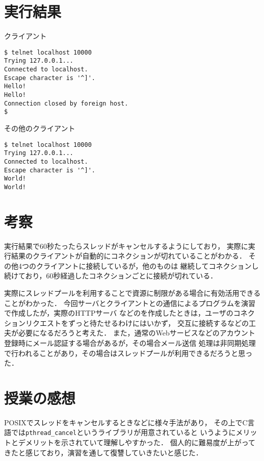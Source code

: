 \documentclass[10pt]{jarticle}
\begin{document}
\newpage

\section{実行結果}
\begin{itembox}[l]{クライアント}
  \begin{verbatim}
$ telnet localhost 10000
Trying 127.0.0.1...
Connected to localhost.
Escape character is '^]'.
Hello!
Hello!
Connection closed by foreign host.
$
  \end{verbatim}
\end{itembox}

\begin{itembox}[l]{その他のクライアント}
  \begin{verbatim}
$ telnet localhost 10000
Trying 127.0.0.1...
Connected to localhost.
Escape character is '^]'.
World!
World!
  \end{verbatim}
\end{itembox}

\section{考察}
実行結果で60秒たったらスレッドがキャンセルするようにしており，
実際に実行結果のクライアントが自動的にコネクションが切れていることがわかる．
その他4つのクライアントに接続しているが，他のものは
継続してコネクションし続けており，60秒経過したコネクションごとに接続が切れている．

実際にスレッドプールを利用することで資源に制限がある場合に有効活用できることがわかった．
今回サーバとクライアントとの通信によるプログラムを演習で作成したが，実際のHTTPサーバ
などのを作成したときは，ユーザのコネクションリクエストをずっと待たせるわけにはいかず，
交互に接続するなどの工夫が必要になるだろうと考えた．
また，通常のWebサービスなどのアカウント登録時にメール認証する場合があるが，その場合メール送信
処理は非同期処理で行われることがあり，その場合はスレッドプールが利用できるだろうと思った．

\section{授業の感想}
POSIXでスレッドをキャンセルするときなどに様々手法があり，
その上でC言語では\verb|pthread_cancel|というライブラリが用意されていると
いうようにメリットとデメリットを示されていて理解しやすかった．
個人的に難易度が上がってきたと感じており，演習を通して復讐していきたいと感じた．
\end{document}
